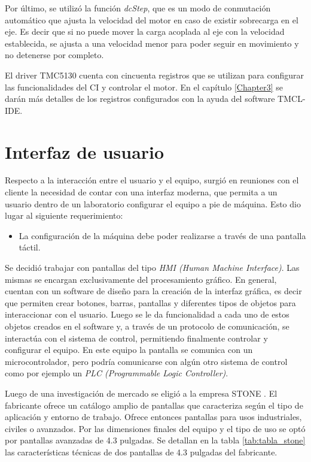 Por último, se utilizó la función \textit{dcStep}, que es un modo de conmutación automático que ajusta la velocidad del motor en caso de existir sobrecarga en el eje. Es decir que si no puede mover la carga acoplada al eje con la velocidad establecida, se ajusta a una velocidad menor para poder seguir en movimiento y no detenerse por completo. 


El driver TMC5130 cuenta con cincuenta registros que se utilizan para configurar las funcionalidades del CI y controlar el motor. En el capítulo \ref{Chapter3} se darán más detalles de los registros configurados con la ayuda del software TMCL-IDE.  


\section{Interfaz de usuario}
\label{sec:interfaz_pantalla}

Respecto a la interacción entre el usuario y el equipo, surgió en reuniones con el cliente la necesidad de contar con una interfaz moderna, que permita a un usuario dentro de un laboratorio configurar el equipo a pie de máquina. Esto dio lugar al siguiente requerimiento:
\begin{itemize}
\item La configuración de la máquina debe poder realizarse a través de una pantalla táctil.	
\end{itemize} 

Se decidió trabajar con pantallas del tipo \textit{HMI (Human Machine Interface)}. Las mismas se encargan exclusivamente del procesamiento gráfico. En general, cuentan con un software de diseño para la creación de la interfaz gráfica, es decir que permiten crear botones, barras, pantallas y diferentes tipos de objetos para interaccionar con el usuario. Luego se le da funcionalidad a cada uno de estos objetos creados en el software y, a través de un protocolo de comunicación, se interactúa con el sistema de control, permitiendo finalmente controlar y configurar el equipo. En este equipo la pantalla se comunica con un microcontrolador, pero  podría  comunicarse con algún otro sistema de control como por ejemplo un \textit{PLC (Programmable Logic Controller)}.
 

Luego de una investigación de mercado se eligió a la empresa STONE \citep{web_stone}. El fabricante ofrece un catálogo amplio de pantallas que caracteriza según el tipo de aplicación y entorno de trabajo. Ofrece entonces pantallas para usos industriales, civiles o avanzados. Por las dimensiones finales del equipo y el tipo de uso se optó por pantallas avanzadas de 4.3 pulgadas. Se detallan en la tabla \ref{tab:tabla_stone} las características técnicas de dos pantallas de 4.3 pulgadas del fabricante.

